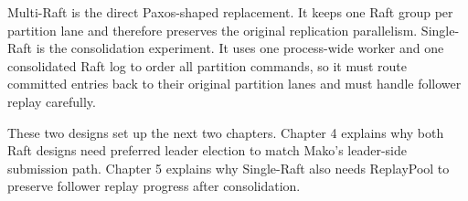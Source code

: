 Multi-Raft is the direct Paxos-shaped replacement. It keeps one Raft group per
partition lane and therefore preserves the original replication parallelism.
Single-Raft is the consolidation experiment. It uses one process-wide worker
and one consolidated Raft log to order all partition commands, so it must route
committed entries back to their original partition lanes and must handle
follower replay carefully.

These two designs set up the next two chapters. Chapter 4 explains why both
Raft designs need preferred leader election to match Mako's leader-side
submission path. Chapter 5 explains why Single-Raft also needs ReplayPool to
preserve follower replay progress after consolidation.
